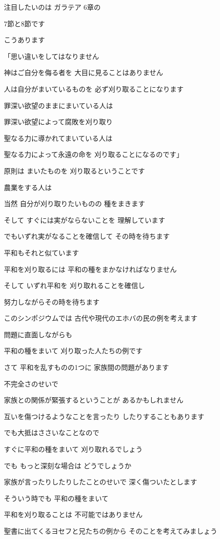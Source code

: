 \documentclass[twocolumn]{jsarticle}
\begin{document}
注目したいのは ガラテア 6章の

7節と8節です

こうあります

「思い違いをしてはなりません

神はご自分を侮る者を
大目に見ることはありません

人は自分がまいているものを
必ず刈り取ることになります

罪深い欲望のままにまいている人は

罪深い欲望によって腐敗を刈り取り

聖なる力に導かれてまいている人は

聖なる力によって永遠の命を
刈り取ることになるのです」

原則は まいたものを
刈り取るということです

農業をする人は

当然 自分が刈り取りたいものの
種をまきます

そして すぐには実がならないことを
理解しています

でもいずれ実がなることを確信して
その時を待ちます

平和もそれと似ています

平和を刈り取るには
平和の種をまかなければなりません

そして いずれ平和を
刈り取れることを確信し

努力しながらその時を待ちます

このシンポジウムでは
古代や現代のエホバの民の例を考えます

問題に直面しながらも

平和の種をまいて
刈り取った人たちの例です

さて 平和を乱すものの1つに
家族間の問題があります

不完全さのせいで

家族との関係が緊張するということが
あるかもしれません

互いを傷つけるようなことを言ったり
したりすることもあります

でも大抵はささいなことなので

すぐに平和の種をまいて
刈り取れるでしょう

でも もっと深刻な場合は
どうでしょうか

家族が言ったりしたりしたことのせいで
深く傷ついたとします

そういう時でも 平和の種をまいて

平和を刈り取ることは
不可能ではありません

聖書に出てくるヨセフと兄たちの例から
そのことを考えてみましょう
\end{document}
